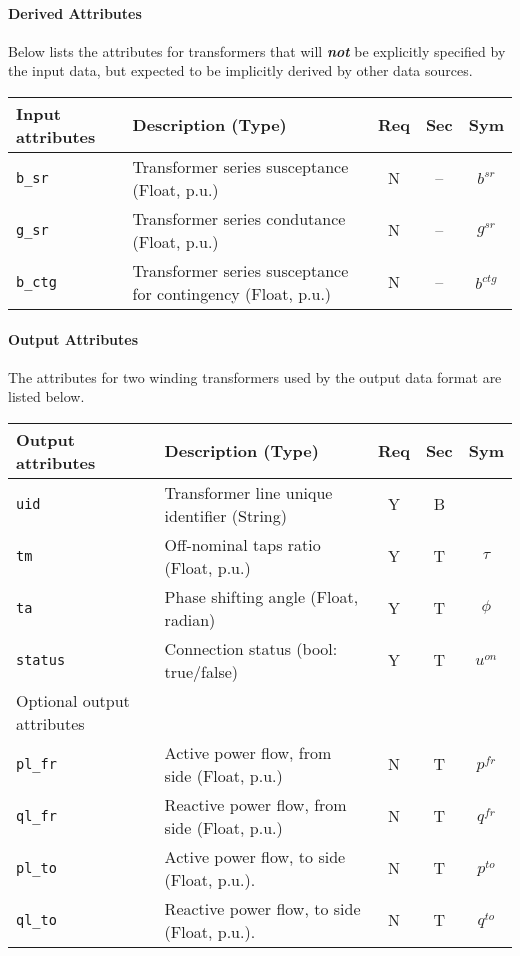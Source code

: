 \documentclass{article}
\begin{document}
\paragraph{Derived Attributes}
Below lists the attributes for transformers that 
will \textit{\textbf{not}} be explicitly 
specified by the input data, but 
expected to be implicitly derived by other data sources.

\begin{center}
\small
\begin{tabular}{ l | l | c | c | c | }
Input attributes & Description (Type)& Req & Sec & Sym\\
\hline
  {\tt b\_sr} & Transformer series susceptance (Float, p.u.)& N & -- & $b^{sr}$\\   
  {\tt g\_sr} & Transformer series condutance  (Float, p.u.)& N & -- & $g^{sr}$\\   
  {\tt b\_ctg} & {Transformer series susceptance for contingency (Float, p.u.)}& N & -- & $b^{ctg}$\\
  \hline
\end{tabular}
\end{center}


\paragraph{Output Attributes}
The attributes for two winding transformers used by the output data format are listed below.
\begin{center}
\small
\begin{tabular}{ l | l | c | c | c |}
Output attributes & Description (Type)& Req & Sec & Sym\\
\hline
 {\tt uid} & Transformer line unique identifier (String)& Y & B & \\
 {\tt tm} & Off-nominal taps ratio (Float, p.u.)& Y & T & $\tau$\\
 {\tt ta} & Phase shifting angle (Float, radian)& Y & T & $\phi$\\
 {\tt status}     & Connection status (bool: true/false) & Y & T & $u^{on}$ \\ 
\hline
  Optional output attributes &   &  & & \\
\hline
 {\tt pl\_fr} & Active power flow, from side (Float, p.u.)  & N & T & $p^{fr}$ \\
 {\tt ql\_fr} & Reactive power flow, from side (Float, p.u.)& N & T & $q^{fr}$ \\
 {\tt pl\_to} & Active power flow, to side (Float, p.u.).   & N & T & $p^{to}$ \\
 {\tt ql\_to} & Reactive power flow, to side (Float, p.u.). & N & T & $q^{to}$ \\
\hline 
\end{tabular}
\end{center}
\end{document}
